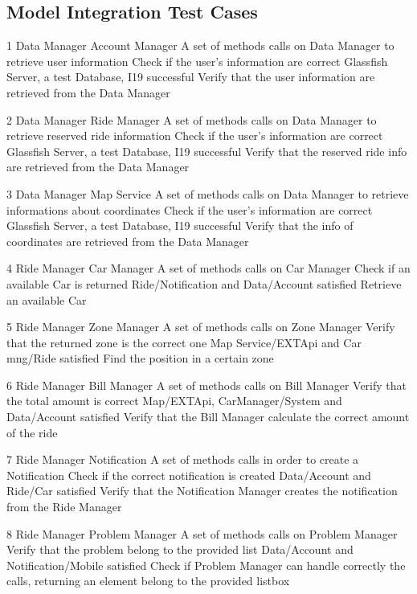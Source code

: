 \subsection{Model Integration Test Cases}
\testCase
	{1}
	{Data Manager}
	{Account Manager}
	{A set of methods calls on Data Manager to retrieve user information}
	{Check if the user's information are correct}
	{Glassfish Server, a test Database, I19 successful}
	{Verify that the user information are retrieved from the Data Manager}

\testCase
	{2}
	{Data Manager}
	{Ride Manager}
	{A set of methods calls on Data Manager to retrieve reserved ride information}
	{Check if the user's information are correct}
	{Glassfish Server, a test Database, I19 successful}
	{Verify that the reserved ride info are retrieved from the Data Manager}
	
\testCase
	{3}
	{Data Manager}
	{Map Service}
	{A set of methods calls on Data Manager to retrieve informations about coordinates}
	{Check if the user's information are correct}
	{Glassfish Server, a test Database, I19 successful}
	{Verify that the info of coordinates are retrieved from the Data Manager}

\testCase
	{4}
	{Ride Manager}
	{Car Manager}
	{A set of methods calls on Car Manager}
	{Check if an available Car is returned}
	{Ride/Notification and Data/Account satisfied}
	{Retrieve an available Car}

\testCase
	{5}
	{Ride Manager}
	{Zone Manager}
	{A set of methods calls on Zone Manager}
	{Verify that the returned zone is the correct one}
	{Map Service/EXTApi and Car mng/Ride satisfied}
	{Find the position in a certain zone}

\testCase
	{6}
	{Ride Manager}
	{Bill Manager}
	{A set of methods calls on Bill Manager}
	{Verify that the total amount is correct}
	{Map/EXTApi, CarManager/System and Data/Account satisfied}
	{Verify that the Bill Manager calculate the correct amount of the ride}

\testCase
	{7}
	{Ride Manager}
	{Notification}
	{A set of methods calls in order to create a Notification}
	{Check if the correct notification is created}
	{Data/Account and Ride/Car satisfied}
	{Verify that the Notification Manager creates the notification from the Ride Manager}
	
\testCase
	{8}
	{Ride Manager}
	{Problem Manager}
	{A set of methods calls on Problem Manager}
	{Verify that the problem belong to the provided list}
	{Data/Account and Notification/Mobile satisfied}
	{Check if Problem Manager can handle correctly the calls, returning an element belong to the provided listbox}
	
